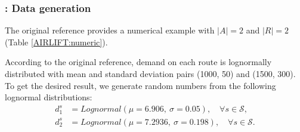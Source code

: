 \subsubsection{\airlift: Data generation}
The original reference \cite{journal:MW1969} provides a numerical example with $|A|=2$ and $|R|=2$ (Table \ref{AIRLIFT:numeric}). 

\begin{table}[H]
	\caption{\airlift: Numerical data in \cite{journal:MW1969}}
	\label{AIRLIFT:numeric}
	\centering
\end{table}
According to the original reference, demand on each route is lognormally distributed with mean and standard deviation pairs (1000, 50) and (1500, 300). To get the desired result, we generate random numbers from the following lognormal distributions:
\begin{align*}
d_1^s&=Lognormal(\mu=6.906,\ \sigma=0.05),\quad\forall s\in\mathcal{S},\\
d_2^s&=Lognormal(\mu=7.2936,\ \sigma=0.198),\quad\forall s\in\mathcal{S}.
\end{align*}


